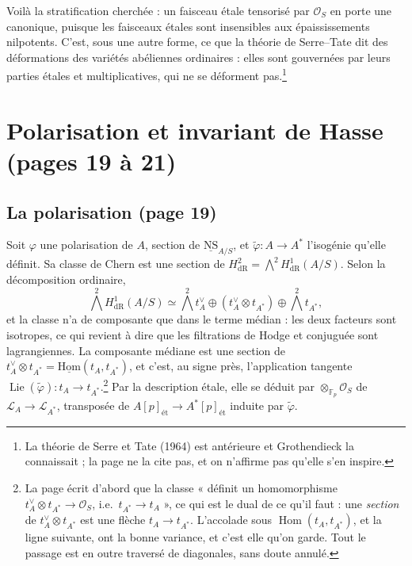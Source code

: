 \documentclass[11pt,a4paper]{article}
\begin{document}
Voilà la stratification cherchée : un faisceau étale tensorisé par
$\mathcal{O}_S$ en porte une canonique, puisque les faisceaux étales sont
insensibles aux épaississements nilpotents. C'est, sous une autre forme, ce que
la théorie de Serre--Tate dit des déformations des variétés abéliennes
ordinaires : elles sont gouvernées par leurs parties étales et
multiplicatives, qui ne se déforment pas.\footnote{La théorie de Serre et Tate
(1964) est antérieure et Grothendieck la connaissait ; la page ne la cite
pas, et on n'affirme pas qu'elle s'en inspire.}

\section*{Polarisation et invariant de Hasse (pages 19 à 21)}

\subsection*{La polarisation (page 19)}

Soit $\varphi$ une polarisation de $A$, section de $\underline{\mathrm{NS}}_{A/S}$,
et $\tilde\varphi : A \to A^*$ l'isogénie qu'elle définit. Sa classe de Chern
est une section de $H^2_{\mathrm{dR}} = \bigwedge^2 H^1_{\mathrm{dR}}(A/S)$. Selon
la décomposition ordinaire,
\[
\textstyle\bigwedge^2 H^1_{\mathrm{dR}}(A/S) \simeq \bigwedge^2 t_A^\vee \oplus
(t_A^\vee \otimes t_{A^*}) \oplus \bigwedge^2 t_{A^*} ,
\]
et la classe n'a de composante que dans le terme médian : les deux facteurs sont
isotropes, ce qui revient à dire que les filtrations de Hodge et conjuguée
sont lagrangiennes. La composante médiane est une section de $t_A^\vee \otimes
t_{A^*} = \underline{\mathrm{Hom}}(t_A, t_{A^*})$, et c'est, au signe près,
l'application tangente $\operatorname{Lie}(\tilde\varphi) : t_A \to
t_{A^*}$.\footnote{La page écrit d'abord que la classe « définit un
homomorphisme $t_A^\vee \otimes t_{A^*} \to \mathcal{O}_S$, i.e.\ $t_{A^*} \to
t_A$ », ce qui est le dual de ce qu'il faut : une \emph{section} de $t_A^\vee
\otimes t_{A^*}$ est une flèche $t_A \to t_{A^*}$. L'accolade sous
$\operatorname{Hom}(t_A, t_{A^*})$, et la ligne suivante, ont la bonne
variance, et c'est elle qu'on garde. Tout le passage est en outre traversé de
diagonales, sans doute annulé.} Par la description étale, elle se déduit par
$\otimes_{\mathbb{F}_p} \mathcal{O}_S$ de $\mathcal{L}_A \to \mathcal{L}_{A^*}$,
transposée de $A[p]_{\text{ét}} \to A^*[p]_{\text{ét}}$ induite par
$\tilde\varphi$.
\end{document}
